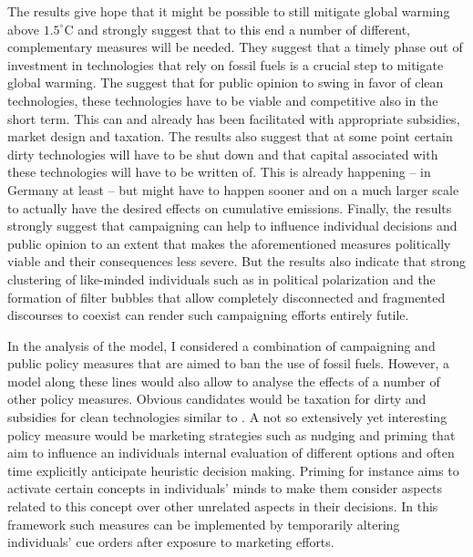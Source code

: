 The results give hope that it might be possible to still mitigate global warming above $1.5^{\circ}$C and strongly suggest that to this end a number of different, complementary measures will be needed. They suggest that a timely phase out of investment in technologies that rely on fossil fuels is a crucial step to mitigate global warming. The suggest that for public opinion to swing in favor of clean technologies, these technologies have to be viable and competitive also in the short term. This can and already has been facilitated with appropriate subsidies, market design and taxation. The results also suggest that at some point certain dirty technologies will have to be shut down and that capital associated with these technologies will have to be written of. This is already happening -- in Germany at least -- but might have to happen sooner and on a much larger scale to actually have the desired effects on cumulative emissions. Finally, the results strongly suggest that campaigning can help to influence individual decisions and public opinion to an extent that makes the aforementioned measures politically viable and their consequences less severe. But the results also indicate that strong clustering of like-minded individuals such as in political polarization and the formation of filter bubbles that allow completely disconnected and fragmented discourses to coexist can render such campaigning efforts entirely futile.

In the analysis of the model, I considered a combination of campaigning and public policy measures that are aimed to ban the use of fossil fuels. However, a model along these lines would also allow to analyse the effects of a number of other policy measures.
Obvious candidates would be taxation for dirty and subsidies for clean technologies similar to \cite{Geier2019}. A not so extensively yet interesting policy measure would be marketing strategies such as nudging and priming that aim to influence an individuals internal evaluation of different options and often time explicitly anticipate heuristic decision making. Priming for instance aims to activate certain concepts in individuals' minds to make them consider aspects related to this concept over other unrelated aspects in their decisions. In this framework such measures can be implemented by temporarily altering individuals' cue orders after exposure to marketing efforts.

